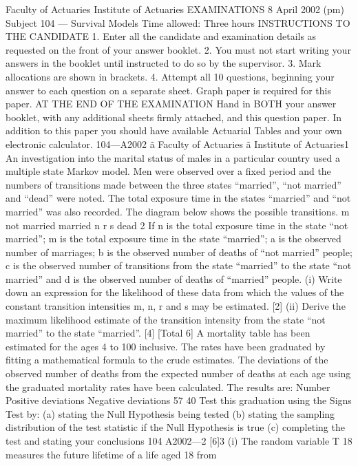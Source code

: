 Faculty of Actuaries
Institute of Actuaries
EXAMINATIONS
8 April 2002 (pm)
Subject 104 — Survival Models
Time allowed: Three hours
INSTRUCTIONS TO THE CANDIDATE
1. Enter all the candidate and examination details as requested on the front of your answer
booklet.
2. You must not start writing your answers in the booklet until instructed to do so by the
supervisor.
3. Mark allocations are shown in brackets.
4. Attempt all 10 questions, beginning your answer to each question on a separate sheet.
Graph paper is required for this paper.
AT THE END OF THE EXAMINATION
Hand in BOTH your answer booklet, with any additional sheets firmly attached, and this
question paper.
In addition to this paper you should have available Actuarial Tables and
your own electronic calculator.
104—A2002
ã Faculty of Actuaries
ã Institute of Actuaries1
An investigation into the marital status of males in a particular country used a
multiple state Markov model. Men were observed over a fixed period and the
numbers of transitions made between the three states “married”, “not married” and
“dead” were noted. The total exposure time in the states “married” and “not married”
was also recorded. The diagram below shows the possible transitions.
m
not married
married
n
r
s
dead
2
If n is the total exposure time in the state “not married”;
m is the total exposure time in the state “married”;
a is the observed number of marriages;
b is the observed number of deaths of “not married” people;
c is the observed number of transitions from the state “married” to the state
“not married” and
d is the observed number of deaths of “married” people.
(i) Write down an expression for the likelihood of these data from which the
values of the constant transition intensities m, n, r and s may be estimated. [2]
(ii) Derive the maximum likelihood estimate of the transition intensity from the
state “not married” to the state “married”.
[4]
[Total 6]
A mortality table has been estimated for the ages 4 to 100 inclusive. The rates have
been graduated by fitting a mathematical formula to the crude estimates. The
deviations of the observed number of deaths from the expected number of deaths at
each age using the graduated mortality rates have been calculated. The results are:
Number
Positive deviations
Negative deviations
57
40
Test this graduation using the Signs Test by:
(a) stating the Null Hypothesis being tested
(b) stating the sampling distribution of the test statistic if the Null Hypothesis is
true
(c) completing the test and stating your conclusions
104 A2002—2
[6]3
(i)
The random variable T 18 measures the future lifetime of a life aged 18 from
